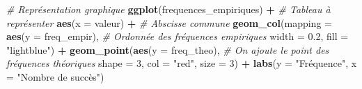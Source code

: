 \documentclass[]{article}
\newenvironment{Shaded}{\begin{snugshade}}{\end{snugshade}}
\newcommand{\CommentTok}[1]{\textcolor[rgb]{0.56,0.35,0.01}{\textit{#1}}}
\newcommand{\DataTypeTok}[1]{\textcolor[rgb]{0.13,0.29,0.53}{#1}}
\newcommand{\DecValTok}[1]{\textcolor[rgb]{0.00,0.00,0.81}{#1}}
\newcommand{\FloatTok}[1]{\textcolor[rgb]{0.00,0.00,0.81}{#1}}
\newcommand{\KeywordTok}[1]{\textcolor[rgb]{0.13,0.29,0.53}{\textbf{#1}}}
\newcommand{\NormalTok}[1]{#1}
\newcommand{\OperatorTok}[1]{\textcolor[rgb]{0.81,0.36,0.00}{\textbf{#1}}}
\newcommand{\OtherTok}[1]{\textcolor[rgb]{0.56,0.35,0.01}{#1}}
\newcommand{\StringTok}[1]{\textcolor[rgb]{0.31,0.60,0.02}{#1}}
\begin{document}
\begin{Shaded}
\end{Shaded}

\begin{Shaded}
\begin{Highlighting}[]
\CommentTok{# Représentation graphique}
\KeywordTok{ggplot}\NormalTok{(frequences_empiriques) }\OperatorTok{+}\StringTok{ }\CommentTok{# Tableau à représenter}
\StringTok{  }\KeywordTok{aes}\NormalTok{(}\DataTypeTok{x =}\NormalTok{ valeur) }\OperatorTok{+}\StringTok{ }\CommentTok{# Abscisse commune}
\StringTok{  }\KeywordTok{geom_col}\NormalTok{(}\DataTypeTok{mapping =} \KeywordTok{aes}\NormalTok{(}\DataTypeTok{y =}\NormalTok{ freq_empir), }\CommentTok{# Ordonnée des fréquences empiriques}
           \DataTypeTok{width =} \FloatTok{0.2}\NormalTok{, }\DataTypeTok{fill =} \StringTok{"lightblue"}\NormalTok{) }\OperatorTok{+}
\StringTok{  }\KeywordTok{geom_point}\NormalTok{(}\KeywordTok{aes}\NormalTok{(}\DataTypeTok{y =}\NormalTok{ freq_theo), }\CommentTok{# On ajoute le point des fréquences théoriques }
             \DataTypeTok{shape =} \DecValTok{3}\NormalTok{, }\DataTypeTok{col =} \StringTok{"red"}\NormalTok{, }\DataTypeTok{size =} \DecValTok{3}\NormalTok{) }\OperatorTok{+}
\StringTok{  }\KeywordTok{labs}\NormalTok{(}\DataTypeTok{y =} \StringTok{"Fréquence"}\NormalTok{, }\DataTypeTok{x =} \StringTok{"Nombre de succès"}\NormalTok{)}
\end{Highlighting}
\end{Shaded}
\end{document}

